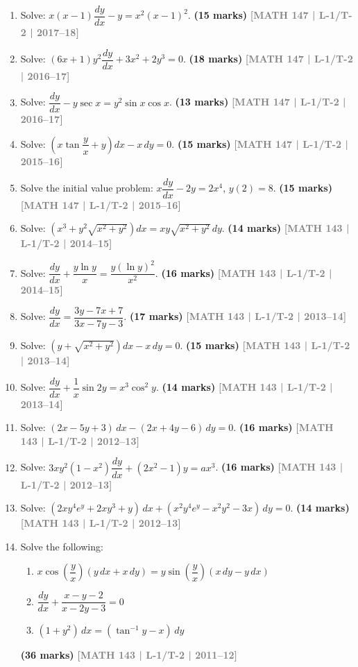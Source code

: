 \documentclass[12pt,a4paper]{article}
\newcommand{\yr}[1]{\hfill\textcolor{gray}{\small\textbf{[#1]}}}
\newcommand{\mk}[1]{\textcolor{orange!70!black}{\small\textbf{(#1 marks)}}}
\begin{document}
\begin{enumerate}
\item Solve: $x(x-1)\dfrac{dy}{dx}-y=x^{2}(x-1)^{2}$.
\mk{15} \yr{MATH 147 | L-1/T-2 | 2017--18}

\item Solve: $(6x+1)y^{2}\dfrac{dy}{dx}+3x^{2}+2y^{3}=0$.
\mk{18} \yr{MATH 147 | L-1/T-2 | 2016--17}

\item Solve: $\dfrac{dy}{dx}-y\sec x=y^{2}\sin x\cos x$.
\mk{13} \yr{MATH 147 | L-1/T-2 | 2016--17}

\item Solve: $\left(x\tan\dfrac{y}{x}+y\right)dx - x\,dy = 0$.
\mk{15} \yr{MATH 147 | L-1/T-2 | 2015--16}

\item Solve the initial value problem: $x\dfrac{dy}{dx}-2y=2x^{4}$, $y(2)=8$.
\mk{15} \yr{MATH 147 | L-1/T-2 | 2015--16}

\item Solve: $\left(x^{3}+y^{2}\sqrt{x^{2}+y^{2}}\right)dx = xy\sqrt{x^{2}+y^{2}}\,dy$.
\mk{14} \yr{MATH 143 | L-1/T-2 | 2014--15}

\item Solve: $\dfrac{dy}{dx}+\dfrac{y\ln y}{x}=\dfrac{y(\ln y)^{2}}{x^{2}}$.
\mk{16} \yr{MATH 143 | L-1/T-2 | 2014--15}

\item Solve: $\dfrac{dy}{dx}=\dfrac{3y-7x+7}{3x-7y-3}$.
\mk{17\textonehalf} \yr{MATH 143 | L-1/T-2 | 2013--14}

\item Solve: $\left(y+\sqrt{x^{2}+y^{2}}\right)dx - x\,dy = 0$.
\mk{15} \yr{MATH 143 | L-1/T-2 | 2013--14}

\item Solve: $\dfrac{dy}{dx}+\dfrac{1}{x}\sin 2y = x^{3}\cos^{2}y$.
\mk{14} \yr{MATH 143 | L-1/T-2 | 2013--14}

\item Solve: $(2x-5y+3)\,dx-(2x+4y-6)\,dy=0$.
\mk{16\textonehalf} \yr{MATH 143 | L-1/T-2 | 2012--13}

\item Solve: $3xy^{2}(1-x^{2})\dfrac{dy}{dx}+(2x^{2}-1)y=ax^{3}$.
\mk{16} \yr{MATH 143 | L-1/T-2 | 2012--13}

\item Solve: $(2xy^{4}e^{y}+2xy^{3}+y)\,dx+(x^{2}y^{4}e^{y}-x^{2}y^{2}-3x)\,dy=0$.
\mk{14} \yr{MATH 143 | L-1/T-2 | 2012--13}

\item Solve the following:
\begin{enumerate}
  \item $x\cos\!\left(\dfrac{y}{x}\right)(y\,dx+x\,dy)=y\sin\!\left(\dfrac{y}{x}\right)(x\,dy-y\,dx)$
  \item $\dfrac{dy}{dx}+\dfrac{x-y-2}{x-2y-3}=0$
  \item $(1+y^{2})\,dx=(\tan^{-1}y - x)\,dy$
\end{enumerate}
\mk{36} \yr{MATH 143 | L-1/T-2 | 2011--12}


\end{enumerate}
\end{document}
